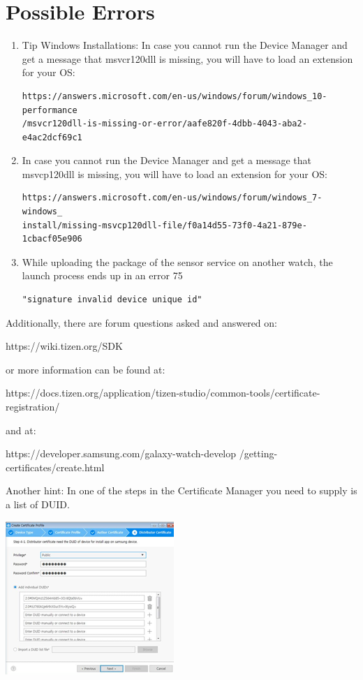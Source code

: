 \documentclass[12pt, a4paper]{article}
\begin{document}
\section{Possible Errors}
\begin{enumerate}
    \item Tip Windows Installations: In case you cannot run the Device Manager and get a message that msvcr120dll is missing, you will have to load an extension for your OS: 
    \begin{verbatim}
https://answers.microsoft.com/en-us/windows/forum/windows_10-performance
/msvcr120dll-is-missing-or-error/aafe820f-4dbb-4043-aba2-e4ac2dcf69c1
    \end{verbatim}
    \item In case you cannot run the Device Manager and get a message that msvcp120dll is missing, you will have to load an extension for your OS: 
\begin{verbatim}
https://answers.microsoft.com/en-us/windows/forum/windows_7-windows_
install/missing-msvcp120dll-file/f0a14d55-73f0-4a21-879e-1cbacf05e906
\end{verbatim}
\item While uploading the package of the sensor service on another watch, the launch process ends up in an error 75
\begin{verbatim}
"signature invalid device unique id"
\end{verbatim}
\end{enumerate}

Additionally, there are forum questions asked and answered on:


https://wiki.tizen.org/SDK


or more information can be found at:

https://docs.tizen.org/application/tizen-studio/common-tools/certificate-registration/


and at:

https://developer.samsung.com/galaxy-watch-develop             /getting-certificates/create.html


\cleardoublepage
Another hint: In one of the steps in the Certificate Manager you need to    supply is a list of DUID.
    \begin{center}
    \includegraphics[width=.6\textwidth]{Pic 27.png}
\end{center}
\end{document}
